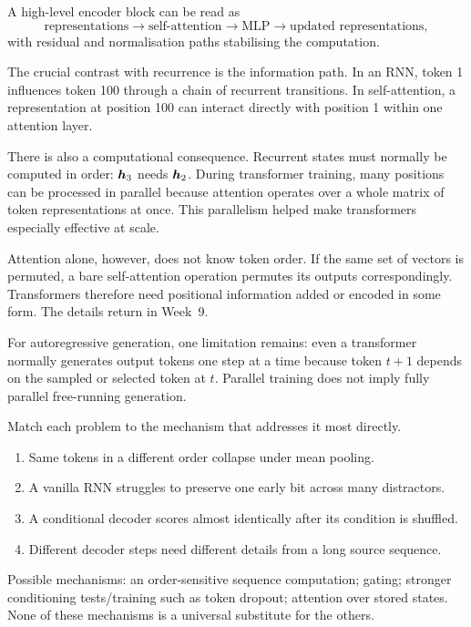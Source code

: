 A high-level encoder block can be read as
\[
  \text{representations}
  \longrightarrow
  \text{self-attention}
  \longrightarrow
  \text{MLP}
  \longrightarrow
  \text{updated representations},
\]
with residual and normalisation paths stabilising the computation.

The crucial contrast with recurrence is the information path. In an RNN, token 1 influences token 100 through a chain of recurrent transitions. In self-attention, a representation at position 100 can interact directly with position 1 within one attention layer.

There is also a computational consequence. Recurrent states must normally be computed in order: \(\bm{h}_3\) needs \(\bm{h}_2\). During transformer training, many positions can be processed in parallel because attention operates over a whole matrix of token representations at once. This parallelism helped make transformers especially effective at scale.

Attention alone, however, does not know token order. If the same set of vectors is permuted, a bare self-attention operation permutes its outputs correspondingly. Transformers therefore need positional information added or encoded in some form. The details return in Week~9.

For autoregressive generation, one limitation remains: even a transformer normally generates output tokens one step at a time because token \(t+1\) depends on the sampled or selected token at \(t\). Parallel training does not imply fully parallel free-running generation.

\begin{checkpointbox}
Match each problem to the mechanism that addresses it most directly.

\begin{enumerate}[leftmargin=*]
  \item Same tokens in a different order collapse under mean pooling.
  \item A vanilla RNN struggles to preserve one early bit across many distractors.
  \item A conditional decoder scores almost identically after its condition is shuffled.
  \item Different decoder steps need different details from a long source sequence.
\end{enumerate}

Possible mechanisms: an order-sensitive sequence computation; gating; stronger conditioning tests/training such as token dropout; attention over stored states. None of these mechanisms is a universal substitute for the others.
\end{checkpointbox}

